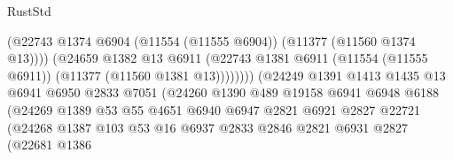 \begin{lexlean}{RustStd}
\begin{coremodule}
                                            (@22743
                                              @1374
                                              @6904
                                              (@11554 (@11555 @6904))
                                              (@11377 (@11560 @1374 @13))))
                                          (@24659
                                            @1382
                                            @13
                                            @6911
                                            (@22743
                                              @1381
                                              @6911
                                              (@11554 (@11555 @6911))
                                              (@11377 (@11560 @1381 @13))))))))
                                  (@24249
                                    @1391
                                    @1413
                                    @1435
                                    @13
                                    @6941
                                    @6950
                                    @2833
                                    @7051
                                    (@24260
                                      @1390
                                      @489
                                      @19158
                                      @6941
                                      @6948
                                      @6188
                                      (@24269
                                        @1389
                                        @53
                                        @55
                                        @4651
                                        @6940
                                        @6947
                                        @2821
                                        @6921
                                        @2827
                                        @22721
                                        (@24268
                                          @1387
                                          @103
                                          @53
                                          @16
                                          @6937
                                          @2833
                                          @2846
                                          @2821
                                          @6931
                                          @2827
                                          (@22681
                                            @1386

\end{coremodule}
\end{lexlean}
